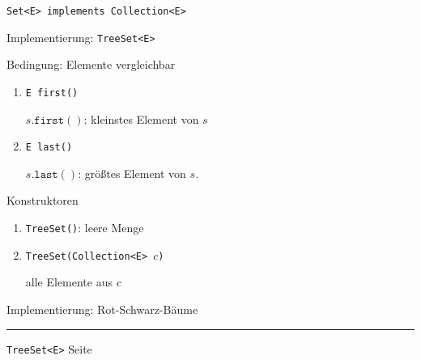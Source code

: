 \documentclass{slides}
\newcounter{mypage}
\begin{document}
\begin{slide}{}
\normalsize

\begin{center}
 \texttt{Set<E> implements Collection<E>}
\end{center}
\vspace*{0.5cm}

\footnotesize
Implementierung: \texttt{TreeSet<E>}

Bedingung: Elemente vergleichbar
\begin{enumerate}
\item \texttt{E first()}

      $s.\mathtt{first}()$: \quad kleinstes Element von $s$
\item \texttt{E last()}

      $s.\mathtt{last}()$: \quad gr\"o{\ss}tes Element von $s$.
\end{enumerate}
Konstruktoren
\begin{enumerate}
\item \texttt{TreeSet()}: \quad leere Menge
\item \texttt{TreeSet(Collection<E> $c$)}
  
      alle Elemente aus $c$ 
\end{enumerate}
\vspace*{0.5cm}

\begin{center}
Implementierung: Rot-Schwarz-B\"aume  
\end{center}


\vspace*{\fill}
\tiny \addtocounter{mypage}{1}
\rule{17cm}{1mm}
\texttt{TreeSet<E>} \hspace*{\fill} Seite 
\end{slide}


\end{document}
